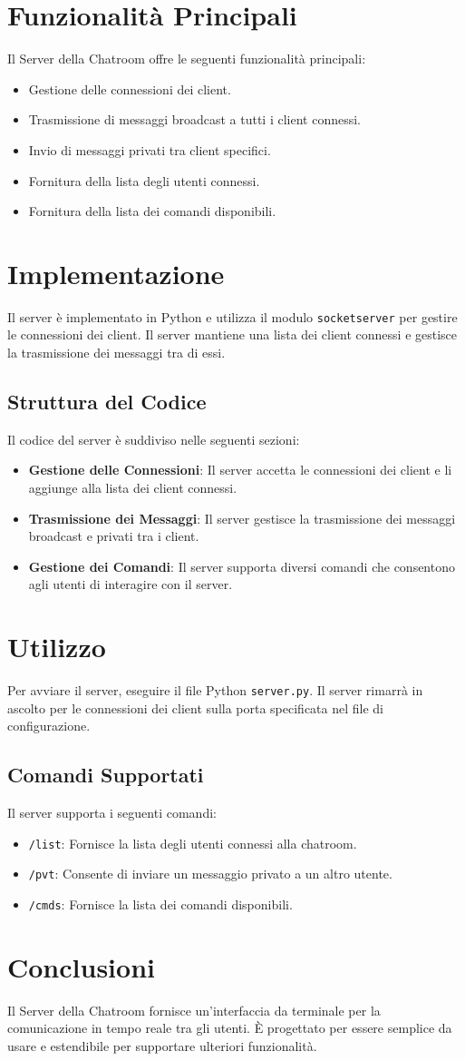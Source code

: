 \documentclass[a4paper,12pt]{report}
\begin{document}
\section{Funzionalità Principali}
Il Server della Chatroom offre le seguenti funzionalità principali:
\begin{itemize}
	\item Gestione delle connessioni dei client.
	\item Trasmissione di messaggi broadcast a tutti i client connessi.
	\item Invio di messaggi privati tra client specifici.
	\item Fornitura della lista degli utenti connessi.
	\item Fornitura della lista dei comandi disponibili.
\end{itemize}
\section{Implementazione}
Il server è implementato in Python e utilizza il modulo \texttt{socketserver} per gestire le connessioni dei client. Il server mantiene una lista dei client connessi e gestisce la trasmissione dei messaggi tra di essi.
\subsection{Struttura del Codice}
Il codice del server è suddiviso nelle seguenti sezioni:
\begin{itemize}
	\item \textbf{Gestione delle Connessioni}: Il server accetta le connessioni dei client e li aggiunge alla lista dei client connessi.
	\item \textbf{Trasmissione dei Messaggi}: Il server gestisce la trasmissione dei messaggi broadcast e privati tra i client.
	\item \textbf{Gestione dei Comandi}: Il server supporta diversi comandi che consentono agli utenti di interagire con il server.
\end{itemize}
\section{Utilizzo}
Per avviare il server, eseguire il file Python \texttt{server.py}. Il server rimarrà in ascolto per le connessioni dei client sulla porta specificata nel file di configurazione.
\subsection{Comandi Supportati}
Il server supporta i seguenti comandi:
\begin{itemize}
	\item \texttt{/list}: Fornisce la lista degli utenti connessi alla chatroom.
	\item \texttt{/pvt}: Consente di inviare un messaggio privato a un altro utente.
	\item \texttt{/cmds}: Fornisce la lista dei comandi disponibili.
\end{itemize}
\section{Conclusioni}
Il Server della Chatroom fornisce un'interfaccia da terminale per la comunicazione in tempo reale tra gli utenti.
È progettato per essere semplice da usare e estendibile per supportare ulteriori funzionalità.
\end{document}
